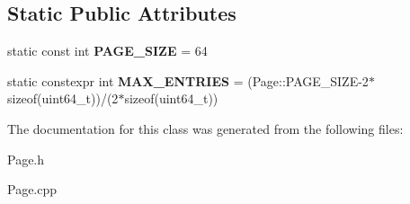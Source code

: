 \subsection*{Static Public Attributes}
\begin{DoxyCompactItemize}
\item 
\hypertarget{class_page_ae213c81894f5b25ab59017f40c2697cd}{}static const int {\bfseries P\+A\+G\+E\+\_\+\+S\+I\+Z\+E} = 64\label{class_page_ae213c81894f5b25ab59017f40c2697cd}

\item 
\hypertarget{class_page_a463fba97b1e91d7e94fc4f9fe71064f0}{}static constexpr int {\bfseries M\+A\+X\+\_\+\+E\+N\+T\+R\+I\+E\+S} = (Page\+::\+P\+A\+G\+E\+\_\+\+S\+I\+Z\+E-\/2$\ast$sizeof(uint64\+\_\+t))/(2$\ast$sizeof(uint64\+\_\+t))\label{class_page_a463fba97b1e91d7e94fc4f9fe71064f0}

\end{DoxyCompactItemize}


The documentation for this class was generated from the following files\+:\begin{DoxyCompactItemize}
\item 
Page.\+h\item 
Page.\+cpp\end{DoxyCompactItemize}
